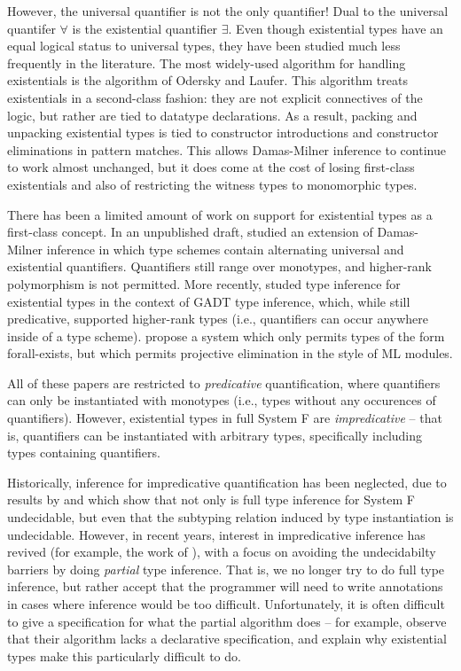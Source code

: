 However, the universal quantifier is not the only quantifier! Dual to the universal quantifer $\forall$ is the existential quantifier $\exists$. Even though existential types have an equal logical status to universal types, they have been studied much less frequently in the literature. The most widely-used algorithm for handling existentials is the algorithm of Odersky and Laufer. This algorithm treats existentials in a second-class fashion: they are not explicit connectives of the logic, but rather are tied to datatype declarations. As a result, packing and unpacking existential types is tied to constructor introductions and constructor eliminations in pattern matches. This allows Damas-Milner inference to continue to work almost unchanged, but it does come at the cost of losing first-class existentials and also of restricting the witness types to monomorphic types.

There has been a limited amount of work on support for existential types as a first-class concept. In an unpublished draft, \citet{leijen06} studied an extension of Damas-Milner inference in which type schemes contain alternating universal and existential quantifiers. Quantifiers still range over monotypes, and higher-rank polymorphism is not permitted. More recently, \citet{dk19} studed type inference for existential types in the context of GADT type inference, which, while still predicative, supported higher-rank types (i.e., quantifiers can occur anywhere inside of a type scheme). \citet{existential-crisis} propose a system which only permits types of the form forall-exists, but which permits projective elimination in the style of ML modules. 

All of these papers are restricted to \emph{predicative} quantification, where quantifiers can only be instantiated with monotypes (i.e., types without any occurences of quantifiers). However, existential types in full System F are \emph{impredicative} -- that is, quantifiers can be instantiated with arbitrary types, specifically including types containing quantifiers.

Historically, inference for impredicative quantification has been neglected, due to results by \citet{tiuryn-urzczyn-96} and \citet{chrzaszcz-98} which show that not only is full type inference for System F undecidable, but even that the subtyping relation induced by type instantiation is undecidable. However, in recent years, interest in impredicative inference has revived (for example, the work of \citet{serrano-2020}), with a focus on avoiding the undecidabilty barriers by doing \emph{partial} type inference. That is, we no longer try to do full type inference, but rather accept that the programmer will need to write annotations in cases where inference would be too difficult. Unfortunately, it is often difficult to give a specification for what the partial algorithm does -- for example, \citet{existential-crisis} observe that their algorithm lacks a declarative specification, and explain why existential types make this particularly difficult to do. 

